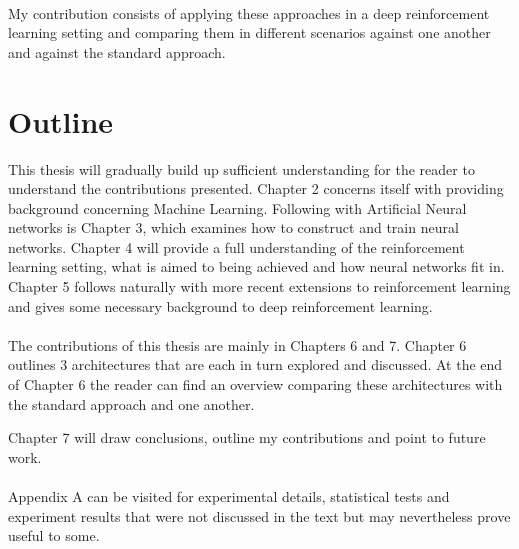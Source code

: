 \paragraph{}
My contribution consists
of applying these approaches
in a deep reinforcement learning setting
and comparing them in different scenarios
against one another and against the standard approach.

\section{Outline}
\label{sec:outline}
This thesis will gradually build up sufficient understanding
for the reader to understand the contributions presented.
Chapter 2 concerns itself with providing background
concerning Machine Learning.
Following with Artificial Neural networks is Chapter 3,
which examines how to construct and train neural networks.
Chapter 4 will provide a full understanding of
the reinforcement learning setting,
what is aimed to being achieved
and how neural networks fit in.
Chapter 5 follows naturally
with more recent extensions
to reinforcement learning
and gives some necessary background
to deep reinforcement learning.

\paragraph{}
The contributions of this thesis are mainly in Chapters 6 and 7.
Chapter 6 outlines 3 architectures
that are each in turn explored and discussed.
At the end of Chapter 6 the reader can find an overview
comparing these architectures with the standard approach
and one another.

Chapter 7 will draw conclusions,
outline my contributions
and point to future work.

\paragraph{}
Appendix A can be visited for experimental details,
statistical tests
and experiment results that were not discussed in the text
but may nevertheless prove useful to some.
